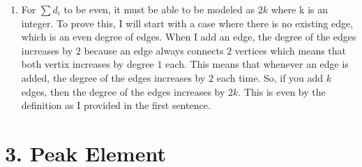 \documentclass[11pt]{article}
\begin{document}
\begin{enumerate}[label=(\alph*)]
\item
For $\sum d_i$ to be even, it must be able to be modeled as $2k$ where k is an integer. To prove this, I will start with a case where there is no existing edge, which is an even degree of edges. When I add an edge, the degree of the edges increases by $2$ because an edge always connects $2$ vertices which means that both vertix increases by degree $1$ each. This means that whenever an edge is added, the degree of the edges increases by $2$ each time. So, if you add $k$ edges, then the degree of the edges increases by $2k$. This is even by the definition as I provided in the first sentence.

\end{enumerate}



\newpage
\section*{3. Peak Element}
\end{document}
